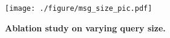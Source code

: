 \begin{figure}[t]
    \vspace{-6mm}
    \begin{center}
    \centerline{\texttt{[image: ./figure/msg\_size\_pic.pdf]}}
    \caption{
        \textbf{Ablation study on varying query size.}} 
        \label{fig:abl_msg}
    \end{center}
        \vspace{-10mm}
\end{figure}
